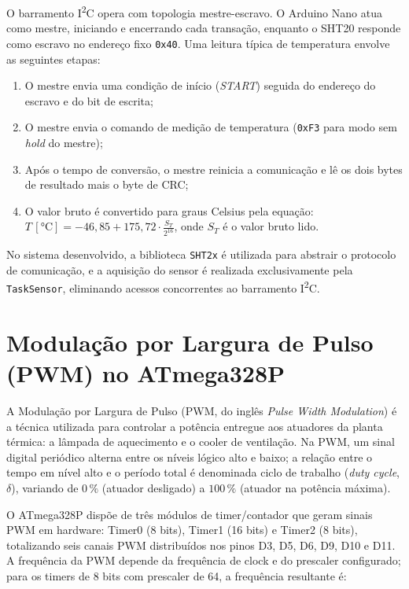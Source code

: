 \documentclass[repeatfields,xlists,xpacks,oneside]{ufrgscca}
\newcommand{\IIC}{I\textsuperscript{2}C}
\begin{document}
O barramento \IIC{} opera com topologia mestre-escravo. O Arduino Nano atua como mestre, iniciando e encerrando cada transação, enquanto o SHT20 responde como escravo no endereço fixo \texttt{0x40}. Uma leitura típica de temperatura envolve as seguintes etapas:

\begin{enumerate}
    \item O mestre envia uma condição de início (\textit{START}) seguida do endereço do escravo e do bit de escrita;
    \item O mestre envia o comando de medição de temperatura (\texttt{0xF3} para modo sem \textit{hold} do mestre);
    \item Após o tempo de conversão, o mestre reinicia a comunicação e lê os dois bytes de resultado mais o byte de CRC;
    \item O valor bruto é convertido para graus Celsius pela equação: $T\,[\text{°C}] = -46{,}85 + 175{,}72 \cdot \frac{S_{T}}{2^{16}}$, onde $S_T$ é o valor bruto lido.
\end{enumerate}

No sistema desenvolvido, a biblioteca \texttt{SHT2x} é utilizada para abstrair o protocolo de comunicação, e a aquisição do sensor é realizada exclusivamente pela \texttt{TaskSensor}, eliminando acessos concorrentes ao barramento \IIC{}.

\section{Modulação por Largura de Pulso (PWM) no ATmega328P}

A Modulação por Largura de Pulso (PWM, do inglês \textit{Pulse Width Modulation}) é a técnica utilizada para controlar a potência entregue aos atuadores da planta térmica: a lâmpada de aquecimento e o cooler de ventilação. Na PWM, um sinal digital periódico alterna entre os níveis lógico alto e baixo; a relação entre o tempo em nível alto e o período total é denominada ciclo de trabalho (\textit{duty cycle}, $\delta$), variando de $0\,\%$ (atuador desligado) a $100\,\%$ (atuador na potência máxima).

O ATmega328P dispõe de três módulos de timer/contador que geram sinais PWM em hardware: Timer0 (8 bits), Timer1 (16 bits) e Timer2 (8 bits), totalizando seis canais PWM distribuídos nos pinos D3, D5, D6, D9, D10 e D11. A frequência da PWM depende da frequência de clock e do prescaler configurado; para os timers de 8 bits com prescaler de 64, a frequência resultante é:
\end{document}
